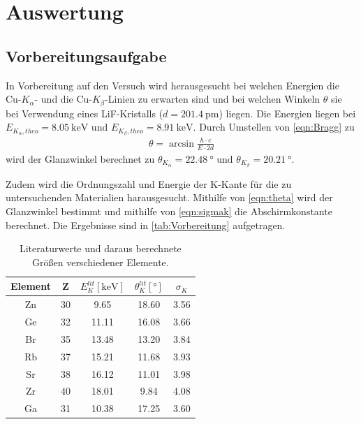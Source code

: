 \section{Auswertung}
\label{sec:Auswertung}

\subsection{Vorbereitungsaufgabe} %
\label{sub:Vorbereitung}

In Vorbereitung auf den Versuch wird herausgesucht bei welchen Energien die Cu-$K_\alpha$- und die Cu-$K_\beta$-Linien
zu erwarten sind und bei welchen Winkeln $\theta$ sie bei Verwendung eines LiF-Kristalls ($d = \qty{201.4}{\pico\meter}$) liegen.
Die Energien liegen bei $E_{K_\alpha,theo}= \qty{8.05}{\kilo\electronvolt}$ und $E_{K_\beta,theo}= \qty{8.91}{\kilo\electronvolt}$\cite{X-Ray}.
Durch Umstellen von \autoref{eqn:Bragg} zu
\begin{align}
  \theta = \arcsin{\frac{h \cdot c} {E \cdot 2 d}} \label{eqn:theta}
\end{align}
wird der Glanzwinkel berechnet zu $\theta_{K_\alpha}= \qty{22.48}{\degree}$ und $\theta_{K_\beta}= \qty{20.21}{\degree}$.

Zudem wird die Ordnungszahl und Energie der K-Kante für die zu untersuchenden Materialien harausgesucht. Mithilfe von
\autoref{eqn:theta} wird der Glanzwinkel bestimmt und mithilfe von \autoref{eqn:sigmak} die Abschirmkonstante berechnet.
Die Ergebnisse sind in \autoref{tab:Vorbereitung} aufgetragen.

\begin{table}[H]
  \centering
  \caption{Literaturwerte und daraus berechnete Größen verschiedener Elemente.\cite{X-Ray}}
  \label{tab:Vorbereitung}
  \begin{tabular}{c S[table-format=2.0] S S S[table-format=1.2] }
  \toprule
  {Element} & {Z} & {$E_{K}^{lit} [\si{\kilo\electronvolt}]$}& {$\theta_{K}^{lit} [\si{\degree}]$} & {$\sigma_K$}\\
  \midrule
    Zn & 30 &  9.65 & 18.60 & 3.56 \\
    Ge & 32 & 11.11 & 16.08 & 3.66 \\
    Br & 35 & 13.48 & 13.20 & 3.84 \\
    Rb & 37 & 15.21 & 11.68 & 3.93 \\
    Sr & 38 & 16.12 & 11.01 & 3.98 \\
    Zr & 40 & 18.01 &  9.84 & 4.08 \\
    Ga & 31 & 10.38 & 17.25 & 3.60 \\ 
  \bottomrule
  \end{tabular}
\end{table}

